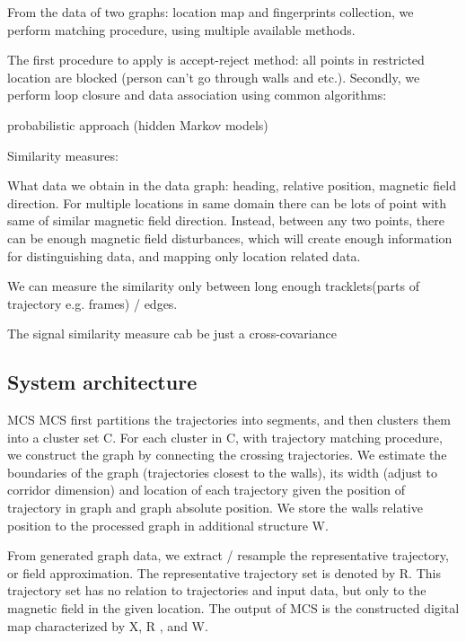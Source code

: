 \documentclass[a4paper, 12pt]{article}
\begin{document}
From the data of two graphs: location map and fingerprints collection, we perform matching procedure, using multiple available methods.

The first procedure to apply is accept-reject method: all points in restricted location are blocked (person can’t go through walls and etc.). Secondly, we perform loop closure and data association using common algorithms:


probabilistic approach (hidden Markov models)

Similarity measures:

What data we obtain in the data graph: heading, relative position, magnetic field direction. For multiple locations in same domain there can be lots of point with same of similar magnetic field direction. Instead, between any two points, there can be enough magnetic field disturbances, which will create enough information for distinguishing data, and mapping only location related data.

We can measure the similarity only between long enough tracklets(parts of trajectory e.g. frames) / edges.

The signal similarity measure cab be just a cross-covariance



\subsection{System architecture}

MCS
MCS first partitions the trajectories into segments, and then clusters them into a cluster set C. For each cluster in C, with trajectory matching procedure, we construct the graph by connecting the crossing trajectories. We estimate the boundaries of the graph (trajectories closest to the walls), its width (adjust to corridor dimension) and location of each trajectory given the position of trajectory in graph and graph absolute position. We store the walls relative position to the processed graph in additional structure W.

From generated graph data, we extract / resample the representative trajectory, or field approximation. The representative trajectory set is denoted by R. This trajectory set has no relation to trajectories and input data, but only to the magnetic field in the given location. The output of MCS is the constructed digital map characterized by X, R , and W.
\end{document}
